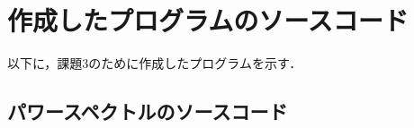     \section{作成したプログラムのソースコード}
以下に，課題3のために作成したプログラムを示す．

    \subsection{パワースペクトルのソースコード} \label{pow}
